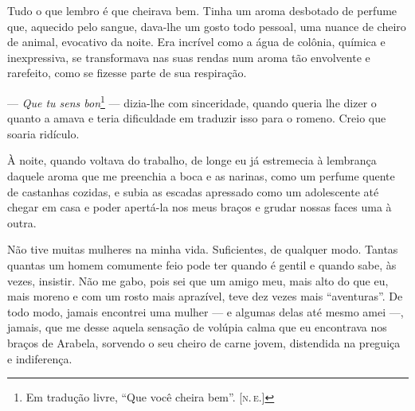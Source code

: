 

Tudo o que lembro é que cheirava bem. Tinha um aroma desbotado de
perfume que, aquecido pelo sangue, dava-lhe um gosto todo pessoal, uma
nuance de cheiro de animal, evocativo da noite. Era incrível como a água
de colônia, química e inexpressiva, se transformava nas suas rendas num
aroma tão envolvente e rarefeito, como se fizesse parte de sua
respiração.

--- \emph{Que tu sens bon}\footnote{Em tradução livre, ``Que você cheira bem''. \textsc{{[}n.\,e.{]}}} --- dizia-lhe com sinceridade, quando queria
lhe dizer o quanto a amava e teria dificuldade em traduzir isso para o
romeno. Creio que soaria ridículo.\label{traduzir}

À noite, quando voltava do trabalho, de longe eu já estremecia à
lembrança daquele aroma que me preenchia a boca e as narinas, como um
perfume quente de castanhas cozidas, e subia as escadas apressado como
um adolescente até chegar em casa e poder apertá-la nos meus braços e
grudar nossas faces uma à outra.

Não tive muitas mulheres na minha vida. Suficientes, de qualquer modo.
Tantas quantas um homem comumente feio pode ter quando é gentil e quando
sabe, às vezes, insistir. Não me gabo, pois sei que um amigo meu, mais
alto do que eu, mais moreno e com um rosto mais aprazível, teve dez
vezes mais ``aventuras''. De todo modo, jamais encontrei uma mulher ---
e algumas delas até mesmo amei ---, jamais, que me desse aquela sensação
de volúpia calma que eu encontrava nos braços de Arabela, sorvendo o seu
cheiro de carne jovem, distendida na preguiça e indiferença.\label{indiferença}

